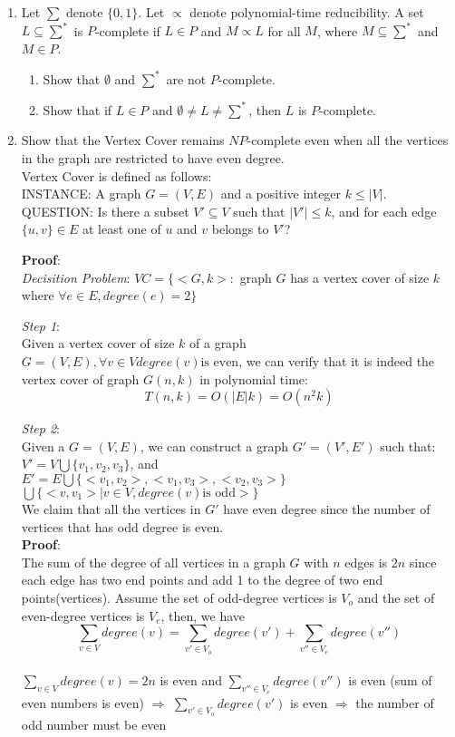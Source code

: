 \documentclass{article}%
\begin{document}
\begin{enumerate}

	\item Let $\sum$ denote $\{0,1\}$. Let $\propto $ denote polynomial-time reducibility. A set $L \subseteq \sum^*$ is $P$-complete if $L \in P$ and $M \propto L$ for all $M$, where $M \subseteq \sum^*$ and $M \in P$.
	\begin {enumerate}
	\item Show that $\emptyset$ and $\sum^*$ are not $P$-complete.
	\item Show that if $L \in P$ and $\emptyset \neq L \neq \sum^*$, then $L$ is  $P$-complete.  
	\end{enumerate}


  \item Show that the Vertex Cover remains $NP$-complete even when all the vertices in the graph 	are restricted to have even degree.\\
  Vertex Cover is defined as follows:\\
  INSTANCE: A graph $G=(V,E)$ and a positive integer $k \leq |V|$.\\
  QUESTION: Is there a subset $V' \subseteq V$ such that $|V'| \leq k$, and for each edge $\{u,v\} \in E$ at least one of $u$ and $v$ belongs to $V'$?
  
  \textbf{Proof}:\\
  \emph{Decisition Problem}: $VC=\{<G,k>:$ graph $G$ has a vertex cover of size $k$ where $\forall e \in E, degree(e) = 2\}$
  
  \emph{Step 1}:\\
  Given a vertex cover of size $k$ of a graph $G=(V,E),\forall v \in V degree(v) \text{is even}$, we can verify that it is indeed the vertex cover of graph $G(n,k)$ in polynomial time:\\
  $$T(n,k)=O(|E|k)=O(n^{2}k)$$
  
   \emph{Step 2}:\\
  Given a $G=(V,E)$, we can construct a graph $G'=(V',E')$ such that:\\
  $V' = V \bigcup \{v_{1},v_{2},v_{3}\}$, and \\
  $E' = E \bigcup \{<v_{1},v_{2}>,<v_{1},v_{3}>,<v_{2},v_{3}>\}$ $\bigcup \{<v,v_{1}>|v \in V, degree(v) \text{is odd}>\}$ \\
  
  We claim that all the vertices in $G'$ have even degree since the number of vertices that has odd degree is even. \\
  \textbf{Proof}:\\ 
  The sum of the degree of all vertices in a graph $G$ with $n$ edges is $2n$ since each edge has two end points and add 1 to the degree of two end points(vertices). Assume the set of odd-degree vertices is $V_{o}$ and the set of even-degree vertices is $V_{e}$, then, we have
  $$\sum_{v\in V}degree(v) = \sum_{v'\in V_{o}}degree(v') +  \sum_{v''\in V_{e}}degree(v'')$$ \\
  $\sum_{v\in V}degree(v)=2n$ is even and $ \sum_{v''\in V_{e}}degree(v'')$ is even (sum of even numbers is even) $\Rightarrow$
  $\sum_{v'\in V_{o}}degree(v')$ is even $\Rightarrow$ the number of odd number must be even\\
  

\end{enumerate}
\end{document}
